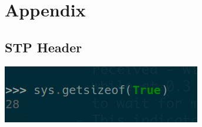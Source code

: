 \documentclass[11pt]{article}
\begin{document}
\section{Appendix}
\label{sec:org41e84b9}
\subsection{STP Header}
\label{sec:org67cf3eb}
\begin{center}
\includegraphics[width=.9\linewidth]{./pythonbool.png}
\end{center}
\end{document}
